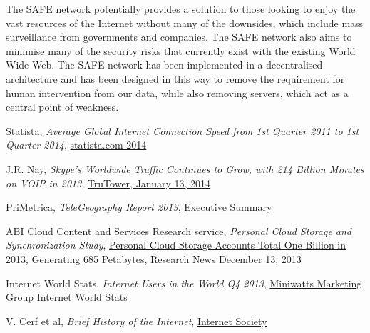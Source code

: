 \documentclass[twocolumn,english]{article}
\begin{document}
The SAFE network potentially provides a solution to those looking
to enjoy the vast resources of the Internet without many of the downsides,
which include mass surveillance from governments and companies. The SAFE
network also aims to minimise many of the security risks that currently
exist with the existing World Wide Web. The SAFE network has been implemented
in a decentralised architecture and has been designed in this way
to remove the requirement for human intervention from our data, while
also removing servers, which act as a central point of weakness.


\begin{thebibliography}{9}

 Statista, \emph{Average Global Internet Connection Speed from 1st Quarter 2011 to 1st Quarter 2014}, \href{http://www.statista.com/statistics/204954/average-internet-connection-speed-worldwide/}{statista.com 2014}

 J.R. Nay, \emph{Skype's Worldwide Traffic Continues to Grow, with 214 Billion Minutes on VOIP in 2013}, \href{http://www.trutower.com/2014/01/13/skype-voip-app-calling-statistics-telegeography/}{TruTower, January 13, 2014}

 PriMetrica, \emph{TeleGeography Report 2013}, \href{http://www.telegeography.com/page_attachments/products/website/research-services/telegeography-report-database/0004/6341/TG_executive_summary.pdf}{Executive Summary}


 ABI Cloud Content and Services Research service, \emph{Personal Cloud Storage and Synchronization Study}, \href{https://www.abiresearch.com/press/personal-cloud-storage-accounts-total-one-billion-}{Personal Cloud Storage Accounts Total One Billion in 2013, Generating 685 Petabytes, Research News December 13, 2013}

 Internet World Stats, \emph{Internet Users in the World Q4 2013}, \href{http://www.internetworldstats.com/stats.htm}{Miniwatts Marketing Group Internet World Stats}

 V. Cerf et al, \emph{Brief History of the Internet}, \href{http://www.internetsociety.org/internet/what-internet/history-internet/brief-history-internet}{Internet Society}


\end{thebibliography}
\end{document}
